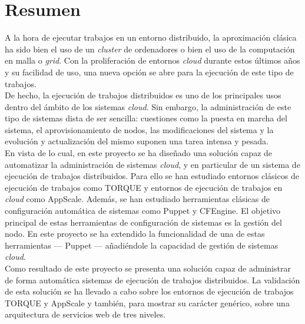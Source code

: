 \chapter{Resumen}
\label{cap:resumen}


A la hora de ejecutar trabajos en un entorno distribuido, la aproximación clásica ha sido bien el uso de un \emph{cluster} de ordenadores o bien el uso de la computación en malla o \emph{grid}. Con la proliferación de entornos \emph{cloud} durante estos últimos años y su facilidad de uso, una nueva opción se abre para la ejecución de este tipo de trabajos.\\

De hecho, la ejecución de trabajos distribuidos es uno de los principales usos dentro del ámbito de los sistemas \emph{cloud}. Sin embargo, la administración de este tipo de sistemas dista de ser sencilla: cuestiones como la puesta en marcha del sistema, el aprovisionamiento de nodos, las modificaciones del sistema y la evolución y actualización del mismo suponen una tarea intensa y pesada.\\

En vista de lo cual, en este proyecto se ha diseñado una solución capaz de automatizar la administración de sistemas \emph{cloud}, y en particular de un sistema de ejecución de trabajos distribuidos. Para ello se han estudiado entornos clásicos de ejecución de trabajos como TORQUE y entornos de ejecución de trabajos en \emph{cloud} como AppScale. Además, se han estudiado herramientas clásicas de configuración automática de sistemas como Puppet y CFEngine. El objetivo principal de estas herramientas de configuración de sistemas es la gestión del nodo. En este proyecto se ha extendido la funcionalidad de una de estas herramientas --- Puppet --- añadiéndole la capacidad de gestión de sistemas \emph{cloud}.\\

Como resultado de este proyecto se presenta una solución capaz de administrar de forma automática sistemas de ejecución de trabajos distribuidos. La validación de esta solución se ha llevado a cabo sobre los entornos de ejecución de trabajos TORQUE y AppScale y también, para mostrar su carácter genérico, sobre una arquitectura de servicios web de tres niveles.
